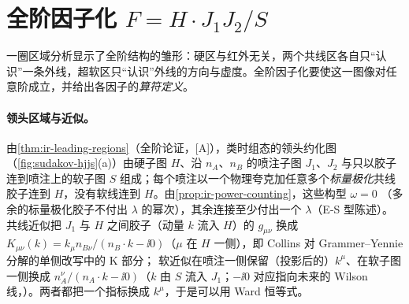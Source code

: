 \section{全阶因子化 \texorpdfstring{$F=H\cdot J_1J_2/S$}{F = H J1 J2 / S}}\label{sec:sudakov-factorization}

一圈区域分析显示了全阶结构的雏形：硬区与红外无关，两个共线区各自只“认识”一条外线，超软区只“认识”外线的方向与虚度。全阶因子化要使这一图像对任意阶成立，并给出各因子的\emph{算符定义}。

\paragraph{领头区域与近似。}由\cref{thm:ir-leading-regions}（全阶论证，[A]），类时组态的领头约化图（\cref{fig:sudakov-hjjs}(a)）由硬子图 $H$、沿 $n_A$、$n_B$ 的喷注子图 $J_1$、$J_2$
与只以胶子连到喷注上的软子图 $S$ 组成；每个喷注以一个物理夸克加任意多个\emph{标量极化}共线胶子连到 $H$，没有软线连到 $H$。由\cref{prop:ir-power-counting}，这些构型 $\omega=0$
（多余的标量极化胶子不付出 $\lambda$ 的幂次），其余连接至少付出一个 $\lambda$（E-S 型陈述）。共线近似把 $J_1$ 与 $H$ 之间胶子（动量 $k$ 流入 $H$）的 $g_{\mu\nu}$ 换成
$K_{\mu\nu}(k)=k_\mu n_{B\nu}/(n_B\cdot k-\ii0)$（$\mu$ 在 $H$ 一侧），即 Collins 对 Grammer--Yennie 分解\cite{GrammerYennie1973}的单侧改写中的 K 部分\cite[式~(10.23)，第~10.6~节]{Collins2011}；
软近似在喷注一侧保留（投影后的）$k^\mu$、在软子图一侧换成 $n_A^\nu/(n_A\cdot k-\ii0)$（$k$ 由 $S$ 流入 $J_1$；$-\ii0$ 对应指向未来的 Wilson 线，\cite[式~(10.20)、(10.68)]{Collins2011}）。两者都把一个指标换成 $k^\mu$，于是可以用 Ward 恒等式。

